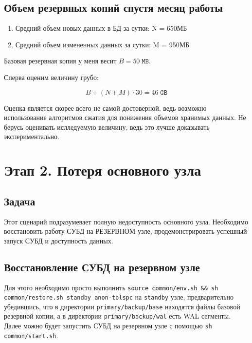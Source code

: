 \documentclass{article}
\begin{document}
\subsection{Объем резервных копий спустя месяц работы}

\begin{enumerate}
    \item Средний объем новых данных в БД за сутки: N = 650МБ
    \item Средний объем измененных данных за сутки: M = 950МБ
\end{enumerate}

Базовая резервная копия у меня весит $B = 50 \; \texttt{MB}$.

Сперва оценим величину грубо:

$$B + (N + M) \cdot 30 = 46 \; \texttt{GB} $$

Оценка является скорее всего не самой достоверной, ведь возможно использование алгоритмов сжатия для понижения объемов хранимых данных. Не берусь оценивать ислледуемую величину, ведь это лучше доказывать экспериментально.

\section{Этап 2. Потеря основного узла}

\subsection{Задача}

Этот сценарий подразумевает полную недоступность основного узла. Необходимо восстановить работу СУБД на РЕЗЕРВНОМ узле, продемонстрировать успешный запуск СУБД и доступность данных.

\subsection{Восстановление СУБД на резервном узле}

Для этого необходимо просто выполнить
\texttt{source common/env.sh \&\& sh common/restore.sh standby anon-tblspc}
на \texttt{standby} узле, предварительно убедившись, что в
директории \texttt{primary/backup/base} находятся файлы базовой резервной копии,
а в директории \texttt{primary/backup/wal} есть WAL сегменты. Далее можно будет запустить СУБД на резервном узле с помощью \texttt{sh common/start.sh}.


\end{document}
